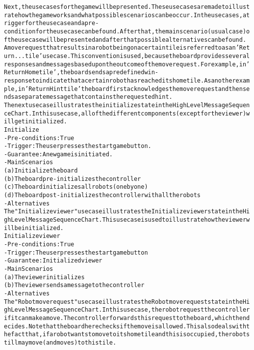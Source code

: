 \begin{alltt}
\rm
Next, the use cases for the game will be presented. These use cases are made to illustrate how the game works and what possible scenarios can be occur. In the use cases, a trigger for the use case and a pre-condition for the use case can be found. After that, the main scenario (usual case) of the use case will be presented and after that possible alternatives can be found. \\
A move request that results in a robot being on a certain tile is referred to as an 'Return ... tile' use case. This convention is used, because the board provides several responses and messages based upon the outcome of the move request. For example, in 'Return Home tile', the board sends a predefined win-response to indicate that a certain robot has reached its home tile. As another example, in 'Return Hint tile' the board first acknowledges the move request and then sends a separate message that contains the requested hint. \\

The next use case illustrates the initialize state in the High Level Message Sequence Chart. In this use case, all of the different components (except for the viewer) will get initialized. \\

Initialize
- Pre-conditions: True
- Trigger: The user presses the start game button.
- Guarantee: A new game is initiated.
- Main Scenarios
    (a) Initialize the board
    (b) The board pre-initializes the controller
    (c) The board initializes all robots (one by one)
    (d) The board post-initializes the controller with all the robots
- Alternatives \\

The "Initialize viewer" use case illustrates the Initialize viewer state in the High Level Message Sequence Chart. This use case is used to illustrate how the viewer will be initialized. \\

Initialize viewer
- Pre-conditions: True
- Trigger: The user presses the start game button
- Guarantee: Initialized viewer
- Main Scenarios
    (a) The viewer initializes
    (b) The viewer sends a message to the controller
- Alternatives \\

The "Robot move request" use case illustrates the Robot move request state in the High Level Message Sequence Chart. In this use case, the robot request the controller if it can make a move. The controller forwards this request to the board, which then decides. Note that the board here checks if the move is allowed. This also deals with the fact that, if a robot wants to move to its home tile and this is occupied, the robot still may move (and moves) to this tile. \\


\end{alltt}

